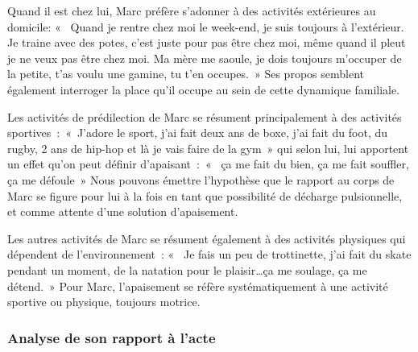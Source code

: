 \documentclass[12pt, a4paper]{book}
\begin{document}
\begin{spacing}{1.5}
Quand il est chez lui, Marc préfère s'adonner à des activités extérieures au domicile: «  Quand je rentre chez moi le week-end, je suis toujours à l'extérieur. Je traine avec des potes, c'est juste pour pas être chez moi, même quand il pleut je ne veux pas être chez moi. Ma mère me saoule, je dois toujours m'occuper de la petite, t'as voulu une gamine, tu t'en occupes. » Ses propos semblent également interroger la place qu'il occupe au sein de cette dynamique familiale.

Les activités de prédilection de Marc se résument principalement à des activités sportives : « J'adore le sport, j'ai fait deux ans de boxe, j'ai fait du foot, du rugby, 2 ans de hip-hop et là je vais faire de la gym » qui selon lui, lui apportent un effet qu'on peut définir d'apaisant : «  ça me fait du bien, ça me fait souffler, ça me défoule » Nous pouvons émettre l'hypothèse que le rapport au corps de Marc se figure pour lui  à la fois en tant que possibilité de décharge pulsionnelle, et comme attente d'une solution d'apaisement.

Les autres activités de Marc se résument également à des activités physiques qui dépendent de l'environnement : «  Je fais un peu de trottinette, j'ai fait du skate pendant un moment, de la natation pour le plaisir…ça me soulage, ça me détend. » Pour Marc, l'apaisement se réfère systématiquement à une activité sportive ou physique, toujours motrice. 

\subsubsection{Analyse de son rapport à l'acte}


\end{spacing}
\end{document}
